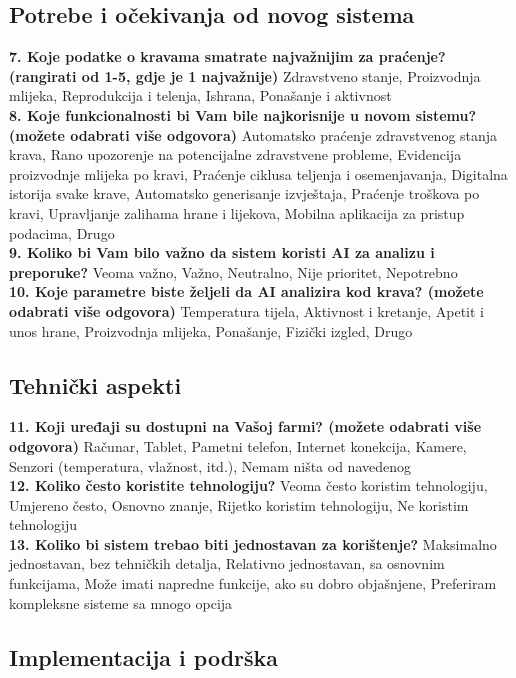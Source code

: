 \documentclass{article}
\begin{document}
\subsection{Potrebe i očekivanja od novog sistema}

\textbf{7. Koje podatke o kravama smatrate najvažnijim za praćenje? (rangirati od 1-5, gdje je 1 najvažnije)} Zdravstveno stanje, Proizvodnja mlijeka, Reprodukcija i telenja, Ishrana, Ponašanje i aktivnost
\\
\textbf{8. Koje funkcionalnosti bi Vam bile najkorisnije u novom sistemu? (možete odabrati više odgovora)} Automatsko praćenje zdravstvenog stanja krava, Rano upozorenje na potencijalne zdravstvene probleme, Evidencija proizvodnje mlijeka po kravi, Praćenje ciklusa teljenja i osemenjavanja, Digitalna istorija svake krave, Automatsko generisanje izvještaja, Praćenje troškova po kravi, Upravljanje zalihama hrane i lijekova, Mobilna aplikacija za pristup podacima, Drugo
\\
\textbf{9. Koliko bi Vam bilo važno da sistem koristi AI za analizu i preporuke?} Veoma važno, Važno, Neutralno, Nije prioritet, Nepotrebno
\\
\textbf{10. Koje parametre biste željeli da AI analizira kod krava? (možete odabrati više odgovora)} Temperatura tijela, Aktivnost i kretanje, Apetit i unos hrane, Proizvodnja mlijeka, Ponašanje, Fizički izgled, Drugo

\subsection{Tehnički aspekti}

\textbf{11. Koji uređaji su dostupni na Vašoj farmi? (možete odabrati više odgovora)} Računar, Tablet, Pametni telefon, Internet konekcija, Kamere, Senzori (temperatura, vlažnost, itd.), Nemam ništa od navedenog
\\
\textbf{12. Koliko često koristite tehnologiju?} Veoma često koristim tehnologiju, Umjereno često, Osnovno znanje, Rijetko koristim tehnologiju, Ne koristim tehnologiju
\\
\textbf{13. Koliko bi sistem trebao biti jednostavan za korištenje?} Maksimalno jednostavan, bez tehničkih detalja, Relativno jednostavan, sa osnovnim funkcijama, Može imati napredne funkcije, ako su dobro objašnjene, Preferiram kompleksne sisteme sa mnogo opcija

\subsection{Implementacija i podrška}
\end{document}
